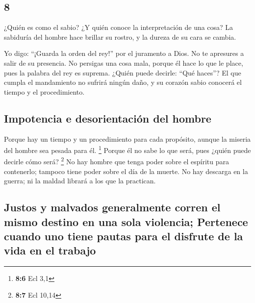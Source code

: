 \begin{paracol}{2}
\hypertarget{section-14}{%
\section{8}\label{section-14}}

 ¿Quién es como el sabio? ¿Y quién conoce la
interpretación de una cosa? La sabiduría del hombre hace brillar su
rostro, y la dureza de su cara se cambia.

 Yo digo: ``¡Guarda la orden del rey!'' por el juramento a
Dios.  No te apresures a salir de su presencia. No
persigas una cosa mala, porque él hace lo que le place, 
pues la palabra del rey es suprema. ¿Quién puede decirle: ``Qué haces''?
 El que cumpla el mandamiento no sufrirá ningún daño, y su
corazón sabio conocerá el tiempo y el procedimiento.

\hypertarget{impotencia-e-desorientaciuxf3n-del-hombre}{%
\subsection{Impotencia e desorientación del
hombre}\label{impotencia-e-desorientaciuxf3n-del-hombre}}

 Porque hay un tiempo y un procedimiento para cada
propósito, aunque la miseria del hombre sea pesada para él. \footnote{\textbf{8:6}
  Ecl 3,1}  Porque él no sabe lo que será, pues ¿quién
puede decirle cómo será? \footnote{\textbf{8:7} Ecl 10,14}
 No hay hombre que tenga poder sobre el espíritu para
contenerlo; tampoco tiene poder sobre el día de la muerte. No hay
descarga en la guerra; ni la maldad librará a los que la practican.

\hypertarget{justos-y-malvados-generalmente-corren-el-mismo-destino-en-una-sola-violencia-pertenece-cuando-uno-tiene-pautas-para-el-disfrute-de-la-vida-en-el-trabajo}{%
\subsection{Justos y malvados generalmente corren el mismo destino en
una sola violencia; Pertenece cuando uno tiene pautas para el disfrute
de la vida en el
trabajo}\label{justos-y-malvados-generalmente-corren-el-mismo-destino-en-una-sola-violencia-pertenece-cuando-uno-tiene-pautas-para-el-disfrute-de-la-vida-en-el-trabajo}}


\end{paracol}
